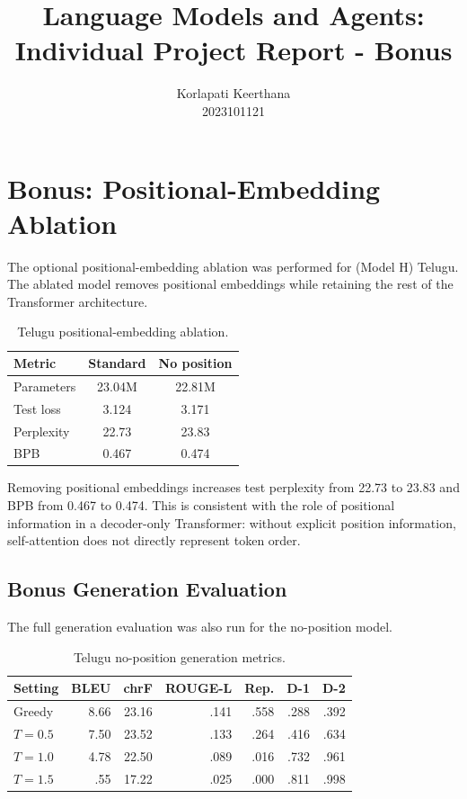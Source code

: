 \documentclass[10pt,a4paper]{article}
\title{
    \vspace{-1.0cm}
    \textbf{Language Models and Agents: Individual Project Report - Bonus}\\
}
\author{
    Korlapati Keerthana\\
    2023101121
}
\date{}
\begin{document}
\maketitle
\vspace{-0.5cm}

\section{Bonus: Positional-Embedding Ablation}

The optional positional-embedding ablation was performed for
(Model H) Telugu. The ablated model removes positional embeddings
while retaining the rest of the Transformer architecture.

\begin{table}[H]
\centering
\small
\caption{Telugu positional-embedding ablation.}
\begin{tabular}{lcc}
\toprule
Metric & \textbf{Standard} & \textbf{No position}\\
\midrule
Parameters & 23.04M & 22.81M\\
Test loss & 3.124 & 3.171\\
Perplexity & 22.73 & 23.83\\
BPB & 0.467 & 0.474\\
\bottomrule
\end{tabular}
\end{table}

Removing positional embeddings increases test perplexity from 22.73
to 23.83 and BPB from 0.467 to 0.474. This is consistent with the
role of positional information in a decoder-only Transformer: without
explicit position information, self-attention does not directly
represent token order.

\subsection{Bonus Generation Evaluation}

The full generation evaluation was also run for the no-position
model.

\begin{table}[H]
\centering
\scriptsize
\caption{Telugu no-position generation metrics.}
\begin{tabular}{lrrrrrr}
\toprule
Setting & BLEU & chrF & ROUGE-L & Rep. & D-1 & D-2\\
\midrule
Greedy & 8.66 & 23.16 & .141 & .558 & .288 & .392\\
$T=0.5$ & 7.50 & 23.52 & .133 & .264 & .416 & .634\\
$T=1.0$ & 4.78 & 22.50 & .089 & .016 & .732 & .961\\
$T=1.5$ & .55 & 17.22 & .025 & .000 & .811 & .998\\
\bottomrule
\end{tabular}
\end{table}
\end{document}
